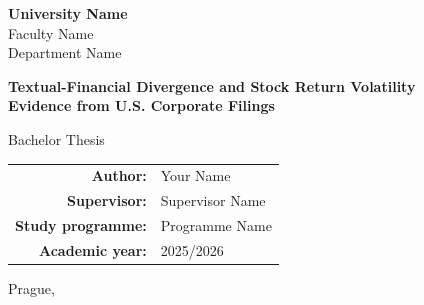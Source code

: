\begin{titlepage}
\centering

\vspace*{1cm}

{\Large\textbf{University Name}}\\[0.3cm]
{\large Faculty Name}\\[0.3cm]
{\large Department Name}

\vspace{3cm}

{\LARGE\textbf{Textual-Financial Divergence and Stock Return Volatility}}\\[0.5cm]
{\Large\textbf{Evidence from U.S. Corporate Filings}}

\vspace{2cm}

{\Large Bachelor Thesis}

\vspace{3cm}

\begin{tabular}{rl}
  \textbf{Author:}     & Your Name \\
  \textbf{Supervisor:}  & Supervisor Name \\
  \textbf{Study programme:} & Programme Name \\
  \textbf{Academic year:}   & 2025/2026 \\
\end{tabular}

\vfill

{\large Prague, \the\year}

\end{titlepage}
